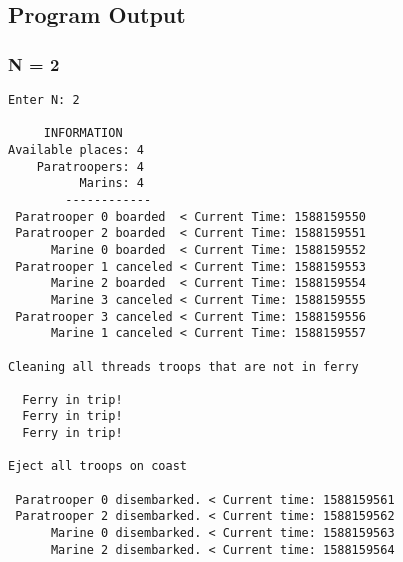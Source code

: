 \documentclass{article}
\begin{document}
\newpage
\subsection{Program Output}
\subsubsection*{N = 2}
\begin{lstlisting}[]
Enter N: 2

     INFORMATION
Available places: 4
    Paratroopers: 4
          Marins: 4
        ------------
 Paratrooper 0 boarded  < Current Time: 1588159550 
 Paratrooper 2 boarded  < Current Time: 1588159551 
      Marine 0 boarded  < Current Time: 1588159552 
 Paratrooper 1 canceled < Current Time: 1588159553 
      Marine 2 boarded  < Current Time: 1588159554 
      Marine 3 canceled < Current Time: 1588159555 
 Paratrooper 3 canceled < Current Time: 1588159556 
      Marine 1 canceled < Current Time: 1588159557 

Cleaning all threads troops that are not in ferry

  Ferry in trip!
  Ferry in trip!
  Ferry in trip!

Eject all troops on coast

 Paratrooper 0 disembarked. < Current time: 1588159561
 Paratrooper 2 disembarked. < Current time: 1588159562
      Marine 0 disembarked. < Current time: 1588159563
      Marine 2 disembarked. < Current time: 1588159564
\end{lstlisting}
\newpage
\end{document}
